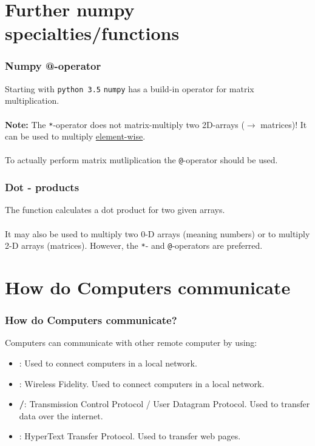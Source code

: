\documentclass{beamer}
\begin{document}
\section{Further numpy specialties/functions}
\begin{frame}
  \frametitle{Numpy @-operator}
Starting with \texttt{python 3.5} \texttt{numpy} has a build-in operator for matrix multiplication. \\
\hspace{5mm}\\
\noindent \textbf{Note:} The \texttt{*}-operator does not matrix-multiply two 2D-arrays ($\rightarrow$ matrices)! It can be used to multiply \underline{element-wise}.\\
\hspace{5mm}\\
\noindent To actually perform matrix mutliplication the \texttt{@}-operator should be used.
\end{frame}
\begin{frame}
  \frametitle{Dot - products}
The  function calculates a dot product for two given arrays. \\
\hspace{5mm}\\
It may also be used to multiply two 0-D arrays (meaning numbers) or to multiply 2-D arrays (matrices). However, the \texttt{*}- and \texttt{@}-operators are preferred.
\end{frame}
\section{How do Computers communicate}
\begin{frame}
  \frametitle{How do Computers communicate?}
  Computers can communicate with other remote computer by using:\\
  \begin{itemize}
    \item \textbf{}: Used to connect computers in a local network.
    \item \textbf{}: Wireless Fidelity. Used to connect computers in a local network.
    \item \textbf{/}: Transmission Control Protocol / User Datagram Protocol. Used to transfer data over the internet.
    \item \textbf{}: HyperText Transfer Protocol. Used to transfer web pages.
  \end{itemize}
\end{frame}
\end{document}
